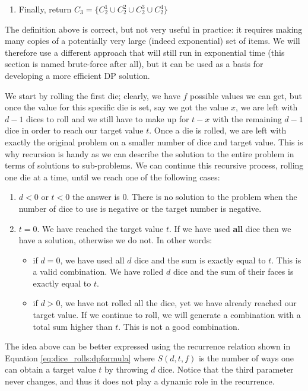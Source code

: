 \begin{enumerate}
	\item  Finally, return $C_3 = \{C_2^1 \cup  C_2^2 \cup C_2^3 \cup C_2^4\}$
	
\end{enumerate}


The definition above is correct, but not very useful in practice: it requires making many copies
of a potentially very large (indeed exponential) set of items. We will therefore use a different approach that will still run in exponential time (this section is named brute-force after all), but it can be used as a basis for developing a more efficient DP solution.

We start by rolling the first die; clearly, we have $f$ possible values we can get, but
once the value for this specific die is set, say we got the value $x$, we are left with $d-1$ dices
to roll and we still have to make up for $t-x$ with the remaining $d-1$ dice in order to reach our target value
$t$. 
Once a die is rolled, we are left with exactly the original problem on a smaller number of dice
and target value. 
This is why recursion is handy as we can describe the solution to the entire problem in terms of solutions to
sub-problems.
We can continue this recursive process, rolling one die at a time, until we reach one of the following cases:
\begin{enumerate}
	\item $d<0$ or $t<0$ the answer is $0$. There is no solution to the problem when the number of
		dice to use is negative or the target number is negative.
	\item $t=0$. We have reached the target value $t$. If we have used \textbf{all} dice then we
		have a solution, otherwise we do not. In other words:
	\begin{itemize}
		\item  if $d=0$, we have used all $d$ dice and the sum is exactly equal to $t$. This is a
		valid combination. We have rolled $d$ dice and the sum of their faces is exactly equal to
		$t$.
		\item if $d>0$, we have not rolled all the dice, yet we have already reached our target
		value. If we continue to roll, we will generate a combination with a total sum higher than
		$t$. This is not a good combination.
	\end{itemize}
\end{enumerate}

The idea above can be better expressed using the recurrence relation shown in Equation
\ref{eq:dice_rolls:dpformula} where $S(d,t,f)$ is the number of ways one can obtain a target value
$t$ by throwing $d$ dice. Notice that the third parameter never changes, and thus it does not play a
dynamic role in the recurrence. 

